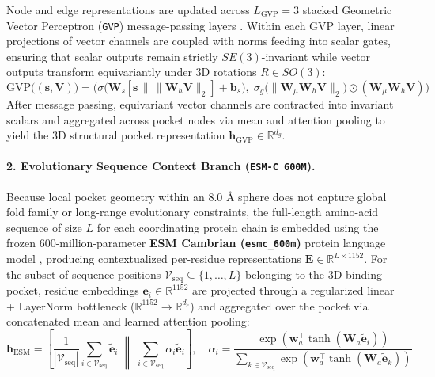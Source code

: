 \documentclass[10pt,a4paper,twocolumn]{article}
\begin{document}
Node and edge representations are updated across $L_{\text{GVP}} = 3$ stacked Geometric Vector Perceptron (\texttt{GVP}) message-passing layers \cite{jing2021gvp}. Within each GVP layer, linear projections of vector channels are coupled with norms feeding into scalar gates, ensuring that scalar outputs remain strictly $SE(3)$-invariant while vector outputs transform equivariantly under 3D rotations $R \in SO(3)$:
\begin{equation}
  \text{GVP}\big((\mathbf{s}, \mathbf{V})\big) = \Big(\sigma\big(\mathbf{W}_s [\mathbf{s} \,\|\, \|\mathbf{W}_h \mathbf{V}\|_2] + \mathbf{b}_s\big),\; \sigma_g\big(\|\mathbf{W}_\mu \mathbf{W}_h \mathbf{V}\|_2\big) \odot (\mathbf{W}_\mu \mathbf{W}_h \mathbf{V})\Big)
\end{equation}
After message passing, equivariant vector channels are contracted into invariant scalars and aggregated across pocket nodes via mean and attention pooling to yield the 3D structural pocket representation $\mathbf{h}_{\text{GVP}} \in \mathbb{R}^{d_g}$.

\paragraph{2. Evolutionary Sequence Context Branch (\texttt{ESM-C 600M}).}
Because local pocket geometry within an $8.0\text{ \AA}$ sphere does not capture global fold family or long-range evolutionary constraints, the full-length amino-acid sequence of size $L$ for each coordinating protein chain is embedded using the frozen 600-million-parameter \textbf{ESM Cambrian (\texttt{esmc\_600m})} protein language model \cite{esmc2024}, producing contextualized per-residue representations $\mathbf{E} \in \mathbb{R}^{L \times 1152}$. For the subset of sequence positions $\mathcal{V}_{\text{seq}} \subseteq \{1, \dots, L\}$ belonging to the 3D binding pocket, residue embeddings $\mathbf{e}_i \in \mathbb{R}^{1152}$ are projected through a regularized linear + LayerNorm bottleneck ($\mathbb{R}^{1152} \to \mathbb{R}^{d_e}$) and aggregated over the pocket via concatenated mean and learned attention pooling:
\begin{equation}
  \mathbf{h}_{\text{ESM}} = \left[ \frac{1}{|\mathcal{V}_{\text{seq}}|} \sum_{i \in \mathcal{V}_{\text{seq}}} \tilde{\mathbf{e}}_i \;\middle\|\; \sum_{i \in \mathcal{V}_{\text{seq}}} \alpha_i \tilde{\mathbf{e}}_i \right], \quad \alpha_i = \frac{\exp(\mathbf{w}_a^\top \tanh(\mathbf{W}_a \tilde{\mathbf{e}}_i))}{\sum_{k \in \mathcal{V}_{\text{seq}}} \exp(\mathbf{w}_a^\top \tanh(\mathbf{W}_a \tilde{\mathbf{e}}_k))}
\end{equation}
\end{document}

